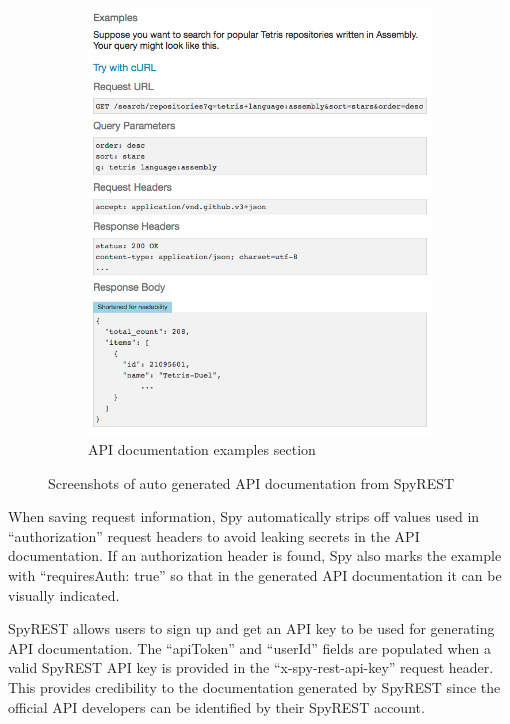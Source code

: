 \documentclass[conference]{IEEEtran}
\begin{document}
\begin{figure}[!tbh]
\begin{subfigure}[t]{0.5\textwidth}
    \includegraphics[width=\linewidth]{spyrest_examples.png}
    \caption{API documentation examples section}
  \end{subfigure}
  \caption{Screenshots of auto generated API documentation from SpyREST}
  \label{fig:spyrest_screenshots}
\end{figure}


When saving request information, Spy automatically strips off values used in ``authorization'' request headers to avoid leaking secrets in the API documentation. If an authorization header is found, Spy also marks the example with ``requiresAuth: true'' so that in the generated API documentation it can be visually indicated.

SpyREST allows users to sign up and get an API key to be used for generating API documentation. The ``apiToken'' and ``userId'' fields are populated when a valid SpyREST API key is provided in the ``x-spy-rest-api-key'' request header. This provides credibility to the documentation generated by SpyREST since the official API developers can be identified by their SpyREST account.
\end{document}
